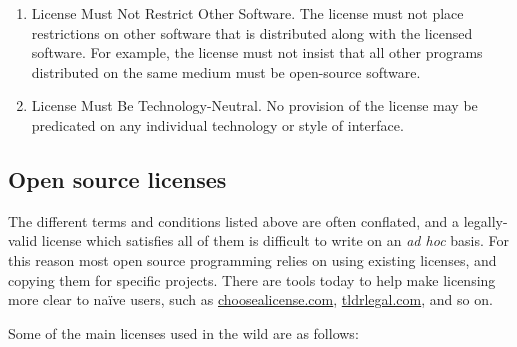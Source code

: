\begin{enumerate}
\item{License Must Not Restrict Other Software}.
  The license must not place restrictions on other software that is distributed along with the licensed software. For example, the license must not insist that all other programs distributed on the same medium must be open-source software.
\item{License Must Be Technology-Neutral}.
  No provision of the license may be predicated on any individual technology or style of interface.
\end{enumerate}

\subsection{Open source licenses}
\label{subsec:licenses}

The different terms and conditions listed above are often conflated, and a legally-valid license which satisfies all of them is difficult to write on an {\it ad hoc} basis. For this reason most open source programming relies on using existing licenses, and copying them for specific projects. There are tools today to help make licensing more clear to na\"ive users, such as \href{https://choosealicense.com}{choosealicense.com}, \href{https://tldrlegal.com}{tldrlegal.com}, and so on.

Some of the main licenses used in the wild are as follows:

